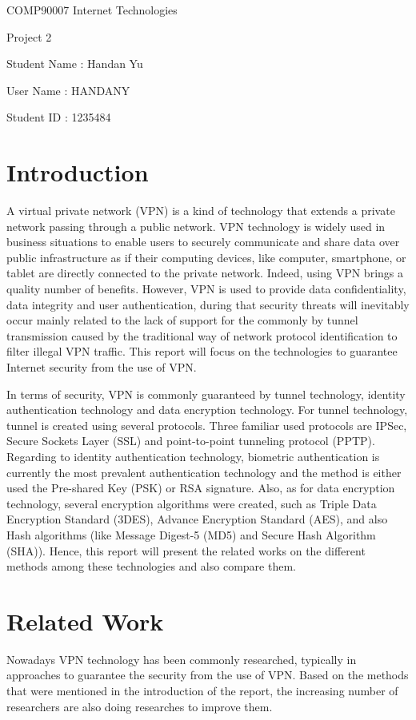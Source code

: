 \documentclass[12pt]{article} %
\title{}  %
\begin{document}
\date{}
\centerline{\large{COMP90007 Internet Technologies}}
\centerline{\large{Project 2}}
\centerline{Student Name : Handan Yu}
\centerline{User Name : HANDANY}
\centerline{Student ID : 1235484}
\section{Introduction}

A virtual private network (VPN) is a kind of technology that extends a private network passing through a public network. VPN technology is widely used in business situations to enable users to securely communicate and share data over public infrastructure as if their computing devices, like computer, smartphone, or tablet are directly connected to the private network. Indeed, using VPN brings a quality number of benefits. However, VPN is used to provide data confidentiality, data integrity and user authentication, during that security threats will inevitably occur mainly related to the lack of support for the commonly by tunnel transmission caused by the traditional way of network protocol identification to filter illegal VPN traffic.  This report will focus on the technologies to guarantee Internet security from the use of VPN.

In terms of security, VPN is commonly guaranteed by tunnel technology, identity authentication technology and data encryption technology. For tunnel technology, tunnel is created using several protocols. Three familiar used protocols are IPSec, Secure Sockets Layer (SSL) and point-to-point tunneling protocol (PPTP). Regarding to identity authentication technology, biometric authentication is currently the most prevalent authentication technology and the method is either used the Pre-shared Key (PSK) or RSA signature. Also, as for data encryption technology, several encryption algorithms were created, such as Triple Data Encryption Standard (3DES), Advance Encryption Standard (AES), and also Hash algorithms (like Message Digest-5 (MD5) and Secure Hash Algorithm (SHA)). Hence, this report will present the related works on the different methods among these technologies and also compare them.
\newpage
\section{Related Work}

Nowadays VPN technology has been commonly researched, typically in approaches to guarantee the security from the use of VPN. Based on the methods that were mentioned in the introduction of the report, the increasing number of researchers are also doing researches to improve them. 
\end{document}
